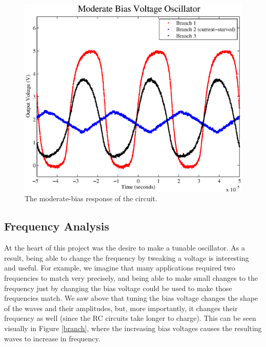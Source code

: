 \documentclass{article}
\begin{document}
\begin{figure}[H]
\centering
\includegraphics[scale=.6]{moderate_bias.eps}
\caption{The moderate-bias response of the circuit. }
\label{moderateBias}
\end{figure}

\subsection*{Frequency Analysis}

At the heart of this project was the desire to make a tunable oscillator. As a result, being able to change the frequency by tweaking a voltage is interesting and useful.  For example, we imagine that many applications required two frequencies to match very precisely, and being able to make small changes to the frequency just by changing the bias voltage could be used to make those frequencies match.  We saw above that tuning the bias voltage changes the shape of the waves and their amplitudes, but, more importantly, it changes their frequency as well (since the RC circuits take longer to charge).  This can be seen visually in Figure \ref{branch}, where the increasing bias voltages causes the resulting waves to increase in frequency.
\end{document}
